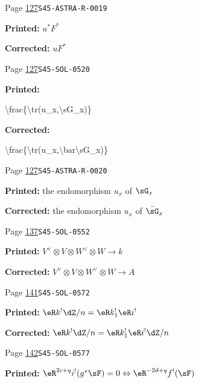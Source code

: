 \begin{description}
\smallskip
\item[\hypertarget{apparatus:EN-0064}{64}] Page \hyperlink{printpage:en:127}{127}\quad\texttt{S45-ASTRA-R-0019}
\par\noindent\textbf{Printed:} \(u^* F^*\)
\par\noindent\textbf{Corrected:} \(u F^*\)
\smallskip
\item[\hypertarget{apparatus:EN-0065}{65}] Page \hyperlink{printpage:en:127}{127}\quad\texttt{S45-SOL-0520}
\par\noindent\textbf{Printed:} {\footnotesize\ttfamily\raggedright \textbackslash{}\allowbreak{}frac\{\allowbreak{}\textbackslash{}\allowbreak{}tr(\allowbreak{}u\_\allowbreak{}x,\allowbreak{}\textbackslash{}\allowbreak{}sG\_\allowbreak{}x)\allowbreak{}\}\allowbreak{}\par}
\par\noindent\textbf{Corrected:} {\footnotesize\ttfamily\raggedright \textbackslash{}\allowbreak{}frac\{\allowbreak{}\textbackslash{}\allowbreak{}tr(\allowbreak{}u\_\allowbreak{}x,\allowbreak{}\textbackslash{}\allowbreak{}bar\textbackslash{}\allowbreak{}sG\_\allowbreak{}x)\allowbreak{}\}\allowbreak{}\par}
\smallskip
\item[\hypertarget{apparatus:EN-0066}{66}] Page \hyperlink{printpage:en:127}{127}\quad\texttt{S45-ASTRA-R-0020}
\par\noindent\textbf{Printed:} the endomorphism $u_x$ of $\sG_x$
\par\noindent\textbf{Corrected:} the endomorphism $u_x$ of $\bar\sG_x$
\smallskip
\item[\hypertarget{apparatus:EN-0067}{67}] Page \hyperlink{printpage:en:137}{137}\quad\texttt{S45-SOL-0552}
\par\noindent\textbf{Printed:} \(V^\vee\otimes V\otimes W^\vee\otimes W\to k\)
\par\noindent\textbf{Corrected:} \(V^\vee\otimes V\otimes W^\vee\otimes W\to A\)
\smallskip
\item[\hypertarget{apparatus:EN-0068}{68}] Page \hyperlink{printpage:en:141}{141}\quad\texttt{S45-SOL-0572}
\par\noindent\textbf{Printed:} \(\eR k^! \dZ/n=\eR k_1^! \eR i^!\)
\par\noindent\textbf{Corrected:} \(\eR k^! \dZ/n=\eR k_1^! \eR i^!\dZ/n\)
\smallskip
\item[\hypertarget{apparatus:EN-0069}{69}] Page \hyperlink{printpage:en:142}{142}\quad\texttt{S45-SOL-0577}
\par\noindent\textbf{Printed:} \(\eR^{2 c+q} i^!(g^*\sF)=0\Leftrightarrow \eR^{-2 d+q}f^!(\sF)\)

\end{description}
